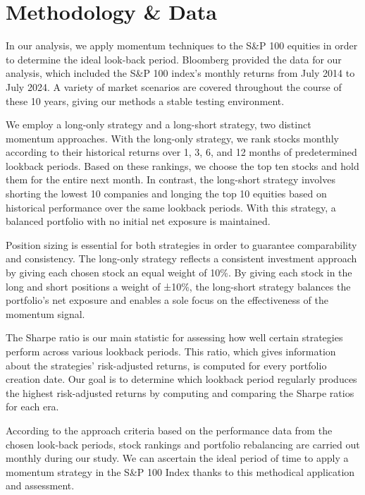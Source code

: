 \documentclass[11pt,a4paper,english,oneside]{book}
\begin{document}

\chapter{Methodology \& Data}
In our analysis, we apply momentum techniques to the S\&P 100 equities in order to determine the ideal look-back period. Bloomberg provided the data for our analysis, which included the S\&P 100 index's monthly returns from July 2014 to July 2024. A variety of market scenarios are covered throughout the course of these 10 years, giving our methods a stable testing environment.

We employ a long-only strategy and a long-short strategy, two distinct momentum approaches. With the long-only strategy, we rank stocks monthly according to their historical returns over 1, 3, 6, and 12 months of predetermined lookback periods. Based on these rankings, we choose the top ten stocks and hold them for the entire next month. In contrast, the long-short strategy involves shorting the lowest 10 companies and longing the top 10 equities based on historical performance over the same lookback periods. With this strategy, a balanced portfolio with no initial net exposure is maintained.

Position sizing is essential for both strategies in order to guarantee comparability and consistency. The long-only strategy reflects a consistent investment approach by giving each chosen stock an equal weight of 10\%. By giving each stock in the long and short positions a weight of ±10\%, the long-short strategy balances the portfolio's net exposure and enables a sole focus on the effectiveness of the momentum signal.

The Sharpe ratio is our main statistic for assessing how well certain strategies perform across various lookback periods. This ratio, which gives information about the strategies' risk-adjusted returns, is computed for every portfolio creation date. Our goal is to determine which lookback period regularly produces the highest risk-adjusted returns by computing and comparing the Sharpe ratios for each era.

According to the approach criteria based on the performance data from the chosen look-back periods, stock rankings and portfolio rebalancing are carried out monthly during our study. We can ascertain the ideal period of time to apply a momentum strategy in the S\&P 100 Index thanks to this methodical application and assessment.
\end{document}
